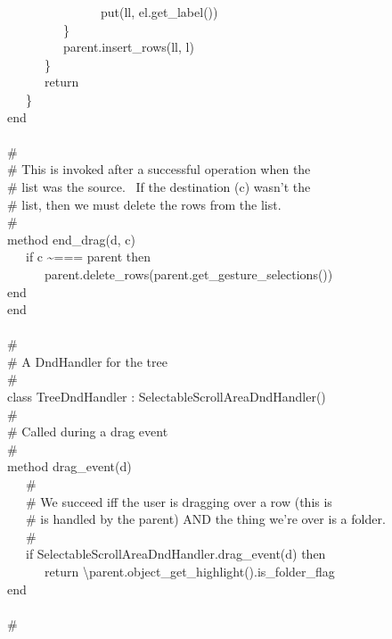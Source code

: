 {\>   \ \ \ \ \ \ \ \ \ \ \ \ \ \ \ put(ll, el.get\_label()) \\
\>   \ \ \ \ \ \ \ \ \ \} \\
\>   \ \ \ \ \ \ \ \ \ parent.insert\_rows(ll, l) \\
\>   \ \ \ \ \ \ \} \\
\>   \ \ \ \ \ \ return \\
\>   \ \ \ \} \\
\>   end \\
\ \\
\>   \# \\
\>   \# This is invoked after a successful operation when the \\
\>   \# list was the source. \ If the destination (c)
wasn't the \\
\>   \# list, then we must delete the rows from the list. \\
\>   \# \\
\>   method end\_drag(d, c) \\
\>   \ \ \ if c \~{}=== parent then \\
\>   \ \ \ \ \ \ parent.delete\_rows(parent.get\_gesture\_selections()) \\
\>   end \\
end \\
\ \\
\# \\
\# A DndHandler for the tree \\
\# \\
class TreeDndHandler : SelectableScrollAreaDndHandler() \\
\>   \# \\
\>   \# Called during a drag event \\
\>   \# \\
\>   method drag\_event(d) \\
\>   \ \ \ \# \\
\>   \ \ \ \# We succeed iff the user is dragging over a row (this is \\
\>   \ \ \ \# is handled by the parent) AND the thing we're over is a folder. \\
\>   \ \ \ \# \\
\>   \ \ \ if SelectableScrollAreaDndHandler.drag\_event(d) then \\
\>   \ \ \ \ \ \ return
{\textbackslash}parent.object\_get\_highlight().is\_folder\_flag \\
\>   end \\
\ \\
\>   \# \\
}
